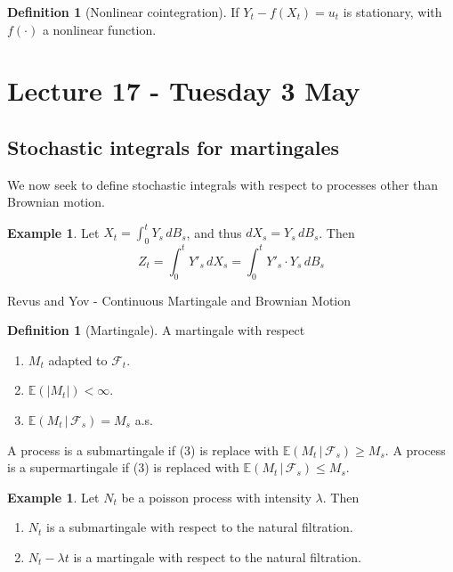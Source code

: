 \documentclass[10pt, oneside, reqno]{amsart}
\theoremstyle{plain}%
\theoremstyle{definition}
\newtheorem{defn}[thm]{Definition}
\newtheorem{exmp}[thm]{Example}
\theoremstyle{remark}
\newcommand{\given}{ \, | \,}
\newcommand{\E}{\mathbb{E}}
\newcommand{\sigf}{\mathcal{F}}
\begin{document}
\begin{defn}[Nonlinear cointegration]
	If $Y_t - f(X_t) = u_t$ is stationary, with $f(\cdot)$ a nonlinear function.   
\end{defn}




\section{Lecture 17 - Tuesday 3 May} %
\label{sec:lecture_17_tuesday_3_may}
\subsection{Stochastic integrals for martingales} %
\label{sub:stochastic_integrals_for_martingales}
We now seek to define stochastic integrals with respect to processes other than Brownian motion.  

\begin{exmp}
	Let $X_t = \int_0^t Y_s \, dB_s$, and thus $dX_s = Y_s \, dB_s$.  Then \[
		Z_t = \int_0^t Y'_s \, dX_s = \int_0^t Y'_s \cdot Y_s \, dB_s
	\]
\end{exmp}

Revus and Yov - Continuous Martingale and Brownian Motion

\begin{defn}[Martingale]
A martingale with respect
\begin{enumerate}[(1)]
	\item $M_t$ adapted to $\sigf_t$.
	\item $\E(|M_t|) < \infty$.
	\item $\E(M_t \given \sigf_s) = M_s$ a.s.
\end{enumerate}

A process is a submartingale if (3) is replace with $\E(M_t \given \sigf_s) \geq M_s$.  A process is a supermartingale if (3) is replaced with $\E(M_t \given \sigf_s) \leq M_s$.  

\end{defn}

\begin{exmp}
	Let $N_t$ be a poisson process with intensity $\lambda$.  Then 
	\begin{enumerate}
		\item $N_t$ is a submartingale with respect to the natural filtration.
		\item $N_t - \lambda t$ is a martingale with respect to the natural filtration.  
	\end{enumerate}
\end{exmp}
\end{document}
